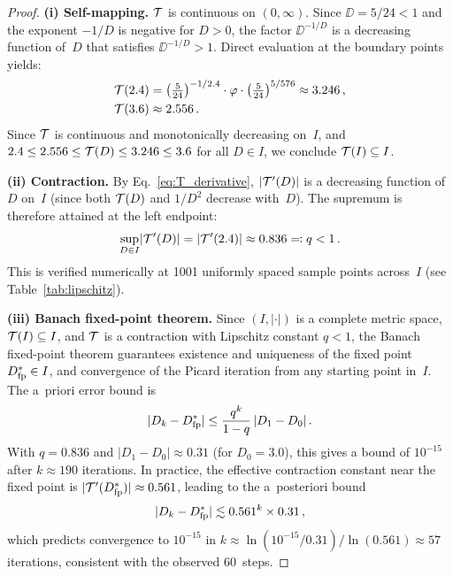 \documentclass[amsmath,amssymb,aps,prd,twocolumn,superscriptaddress,nofootinbib]{revtex4-2}
\begin{document}
\begin{proof}
\textbf{(i) Self-mapping.}\quad
$\mathcal{T}$ is continuous on $(0,\infty)$.  Since $\DD = 5/24 < 1$
and the exponent $-1/D$ is negative for $D > 0$, the factor
$\DD^{-1/D}$ is a decreasing function of~$D$ that satisfies
$\DD^{-1/D} > 1$.  Direct evaluation at the boundary points
yields:
\begin{align}
  \mathcal{T}(2.4) &= \left(\tfrac{5}{24}\right)^{-1/2.4}
               \cdot \varphi
               \cdot \left(\tfrac{5}{24}\right)^{5/576}
              \approx 3.246\,,
              \label{eq:T_24} \\
  \mathcal{T}(3.6) &\approx 2.556\,.
              \label{eq:T_36}
\end{align}
Since $\mathcal{T}$ is continuous and monotonically decreasing on~$I$,
and $2.4 \leq 2.556 \leq \mathcal{T}(D) \leq 3.246 \leq 3.6$ for all
$D \in I$, we conclude $\mathcal{T}(I) \subseteq I$.

\textbf{(ii) Contraction.}\quad
By Eq.~\eqref{eq:T_derivative}, $\lvert\mathcal{T}'(D)\rvert$
is a decreasing function of~$D$ on~$I$ (since both $\mathcal{T}(D)$
and $1/D^2$ decrease with~$D$).  The supremum is therefore attained
at the left endpoint:
\begin{equation}
  \sup_{D \in I}\lvert\mathcal{T}'(D)\rvert
    = \lvert\mathcal{T}'(2.4)\rvert
    \approx 0.836 \eqqcolon q < 1\,.
  \label{eq:lipschitz}
\end{equation}
This is verified numerically at 1001 uniformly spaced sample points
across~$I$ (see Table~\ref{tab:lipschitz}).

\textbf{(iii) Banach fixed-point theorem.}\quad
Since $(I, \lvert\cdot\rvert)$ is a complete metric space,
$\mathcal{T}(I) \subseteq I$, and $\mathcal{T}$ is a contraction with
Lipschitz constant $q < 1$, the Banach fixed-point theorem
guarantees existence and uniqueness of the fixed point
$D^{*}_{\mathrm{fp}} \in I$, and convergence of the Picard iteration from
any starting point in~$I$.  The a~priori error bound is
\begin{equation}
  \lvert D_k - D^{*}_{\mathrm{fp}}\rvert
    \leq \frac{q^k}{1-q}\,\lvert D_1 - D_0\rvert\,.
  \label{eq:apriori}
\end{equation}
With $q = 0.836$ and $\lvert D_1 - D_0\rvert \approx 0.31$
(for $D_0 = 3.0$), this gives a bound of $10^{-15}$ after
$k \approx 190$ iterations.  In practice, the effective
contraction constant near the fixed point is
$\lvert\mathcal{T}'(D^{*}_{\mathrm{fp}})\rvert \approx 0.561$, leading to the
a~posteriori bound
\begin{equation}
  \lvert D_k - D^{*}_{\mathrm{fp}}\rvert
    \lesssim 0.561^k \times 0.31\,,
  \label{eq:aposteriori}
\end{equation}
which predicts convergence to $10^{-15}$ in
$k \approx \ln(10^{-15}/0.31)/\ln(0.561) \approx 57$
iterations, consistent with the observed 60~steps.
\end{proof}
\end{document}

